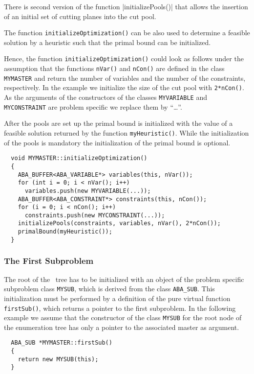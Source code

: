 There is second version of the function |initializePools()| that
allows the insertion of an initial set of cutting planes into the cut
pool.

The function {\tt initializeOptimization()} can be also used to determine
a feasible solution by a heuristic such that the primal bound can
be initialized.

Hence, the function {\tt initializeOptimization()} could look as follows
under the assumption that the functions {\tt nVar()} and {\tt nCon()}
are defined in the class {\tt MYMASTER} and return the number of variables
and the number of the constraints, respectively.  In the example
we initialize the size of the cut pool with {\tt 2*nCon()}.
As the arguments
of the constructors of the classes {\tt MYVARIABLE} and {\tt MYCONSTRAINT} are
problem specific we replace them by ``\dots''.

After the pools are set up the primal bound is initialized with
the value of a feasible solution returned by the function {\tt myHeuristic()}.
While the initialization of the pools is mandatory the initialization
of the primal bound is optional.
\begin{verbatim}
  void MYMASTER::initializeOptimization()
  {
    ABA_BUFFER<ABA_VARIABLE*> variables(this, nVar());
    for (int i = 0; i < nVar(); i++)
      variables.push(new MYVARIABLE(...));
    ABA_BUFFER<ABA_CONSTRAINT*> constraints(this, nCon());
    for (i = 0; i < nCon(); i++)
      constraints.push(new MYCONSTRAINT(...));
    initializePools(constraints, variables, nVar(), 2*nCon());
    primalBound(myHeuristic());
  }
\end{verbatim}

\subsubsection{The First Subproblem}

The root of the \bab\ tree has to be initialized with an object of the
problem specific subproblem class {\tt MYSUB}, which is derived from the
class {\tt ABA\_SUB}. 
This initialization must be performed by a definition
of the pure virtual function {\tt firstSub()}, which returns a pointer
to the first subproblem. In the following example we assume that
the constructor of the class {\tt MYSUB} for the root node of the
enumeration tree has only a pointer to the associated master as argument.
\begin{verbatim}
  ABA_SUB *MYMASTER::firstSub()
  {
    return new MYSUB(this);
  }
\end{verbatim}

